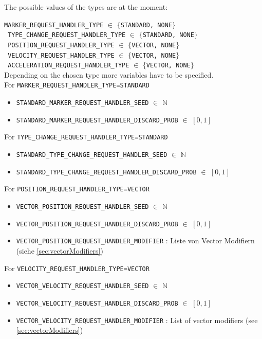 The possible values of the types are at the moment:

\texttt{MARKER\_REQUEST\_HANDLER\_TYPE} $\in$ $\{$\texttt{STANDARD, NONE}$\}$\\
\texttt{ TYPE\_CHANGE\_REQUEST\_HANDLER\_TYPE} $\in$ $\{$\texttt{STANDARD, NONE}$\}$\\
\texttt{ POSITION\_REQUEST\_HANDLER\_TYPE} $\in$ $\{$\texttt{VECTOR, NONE}$\}$\\
\texttt{ VELOCITY\_REQUEST\_HANDLER\_TYPE} $\in$ $\{$\texttt{VECTOR, NONE}$\}$\\
\texttt{ ACCELERATION\_REQUEST\_HANDLER\_TYPE} $\in$ $\{$\texttt{VECTOR, NONE}$\}$\\

Depending on the chosen type more variables have to be specified.\\

For \texttt{MARKER\_REQUEST\_HANDLER\_TYPE=STANDARD} \\
\begin{itemize}
\item \texttt{STANDARD\_MARKER\_REQUEST\_HANDLER\_SEED} $\in$ $\mathbb{N}$
\item \texttt{STANDARD\_MARKER\_REQUEST\_HANDLER\_DISCARD\_PROB} $\in$ $[0,1]$
\end{itemize} 

For \texttt{TYPE\_CHANGE\_REQUEST\_HANDLER\_TYPE=STANDARD} \\
\begin{itemize}
\item \texttt{STANDARD\_TYPE\_CHANGE\_REQUEST\_HANDLER\_SEED} $\in$ $\mathbb{N}$
\item \texttt{STANDARD\_TYPE\_CHANGE\_REQUEST\_HANDLER\_DISCARD\_PROB} $\in$ $[0,1]$
\end{itemize} 

For \texttt{POSITION\_REQUEST\_HANDLER\_TYPE=VECTOR} \\
\begin{itemize}
\item \texttt{VECTOR\_POSITION\_REQUEST\_HANDLER\_SEED} $\in$ $\mathbb{N}$
\item \texttt{VECTOR\_POSITION\_REQUEST\_HANDLER\_DISCARD\_PROB} $\in$ $[0,1]$\\
\item \texttt{VECTOR\_POSITION\_REQUEST\_HANDLER\_MODIFIER} : Liste von Vector Modifiern (siehe \ref{sec:vectorModifiers})
\end{itemize} 

For \texttt{VELOCITY\_REQUEST\_HANDLER\_TYPE=VECTOR} \\
\begin{itemize}
\item \texttt{VECTOR\_VELOCITY\_REQUEST\_HANDLER\_SEED} $\in$ $\mathbb{N}$
\item \texttt{VECTOR\_VELOCITY\_REQUEST\_HANDLER\_DISCARD\_PROB} $\in$ $[0,1]$
\item \texttt{VECTOR\_VELOCITY\_REQUEST\_HANDLER\_MODIFIER} : List of vector modifiers (see \ref{sec:vectorModifiers})
\end{itemize} 

